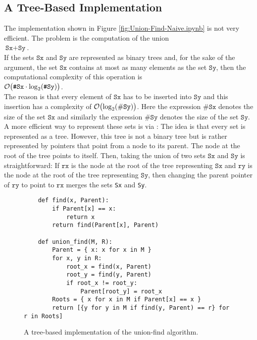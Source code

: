 \subsection{A Tree-Based Implementation}
The implementation shown in Figure \ref{fig:Union-Find-Naive.ipynb} is not very efficient.  The
problem is the computation of the union
\\
\hspace*{1.3cm}
$\texttt{Sx} + \texttt{Sy}$.
\\[0.2cm]
If the sets $\texttt{Sx}$ and $\texttt{Sy}$ are represented as binary trees and, for the sake of the
argument, the set $\texttt{Sx}$ contains at most as many elements as the set $\texttt{Sy}$, then the
computational complexity of this operation is
\\
\hspace*{1.3cm}
$\mathcal{O}\bigl(\texttt{\#Sx} \cdot \log_2(\texttt{\#Sy})\bigr)$.  
\\[0.2cm]
The reason is that every element of $\texttt{Sx}$ has to be inserted into $\texttt{Sy}$ and this
insertion has a complexity of $\mathcal{O}\bigl(\log_2(\#\texttt{Sy})\bigr)$.  Here the expression
$\texttt{\#Sx}$ denotes the size of the set $\texttt{Sx}$ and similarly the expression
$\texttt{\#Sy}$ denotes the size of the set $\texttt{Sy}$.  A more efficient way to
represent these sets is via :  The idea is that every set is represented as a
tree.  However, this tree is not a binary tree but is rather represented by pointers that
point from a node to its parent.  The node at the root of the tree points to itself.  Then, taking the
union of two sets $\texttt{Sx}$ and $\texttt{Sy}$ is straightforward:  If $\texttt{rx}$ is the node at the root of
the tree representing $\texttt{Sx}$ and $\texttt{ry}$ is the node at the root of the tree representing
$\texttt{Sy}$, then changing the parent pointer of $\texttt{ry}$ to point to $\texttt{rx}$ merges the
sets \texttt{Sx} and \texttt{Sy}.


\begin{figure}[!ht]
\centering
\begin{verbatim}
    def find(x, Parent):
        if Parent[x] == x:
            return x
        return find(Parent[x], Parent)

    def union_find(M, R):
        Parent = { x: x for x in M } 
        for x, y in R:
            root_x = find(x, Parent)
            root_y = find(y, Parent)
            if root_x != root_y:
                Parent[root_y] = root_x
        Roots = { x for x in M if Parent[x] == x }
        return [{y for y in M if find(y, Parent) == r} for r in Roots]
\end{verbatim}
\vspace*{-0.3cm}
\caption{A tree-based implementation of the union-find algorithm.}
\label{fig:Union-Find-Tree.ipynb}
\end{figure}

